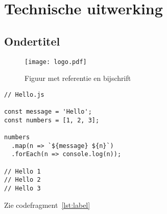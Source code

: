
\section{Technische uitwerking} %
\label{sec:uitwerking}

\subsection{Ondertitel} %
\label{sub:ondertitel}

\lipsum[1]

\begin{figure}[H]
  \label{figure:golden-circle}
  \centering
  \texttt{[image: logo.pdf]}
  \caption{Figuur met referentie en bijschrift \cite{voorbeeld-ref}}
\end{figure}

\begin{lstlisting}[caption={Some Javascript code},label={lst:label}]
// Hello.js

const message = 'Hello';
const numbers = [1, 2, 3];

numbers
  .map(n => `${message} ${n}`)
  .forEach(n => console.log(n));

// Hello 1
// Hello 2
// Hello 3
\end{lstlisting}

Zie codefragment~\ref{lst:label}

\lipsum[1]
